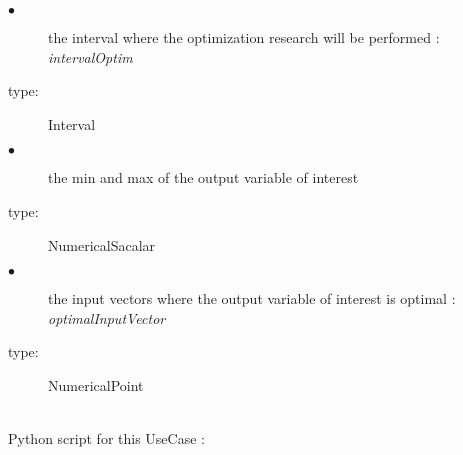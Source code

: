              {
               \begin{description}
               \item[$\bullet$] the interval where the optimization research will be performed : \itshape{intervalOptim}
               \item[type:] Interval
               \item[$\bullet$] the min and max of the output variable of interest
               \item[type:] NumericalSacalar
               \item[$\bullet$] the input vectors where the output variable of interest is optimal : \itshape{optimalInputVector}
               \item[type:] NumericalPoint
               \end{description}
             }

             \textspace\\
             Python script for this UseCase :

